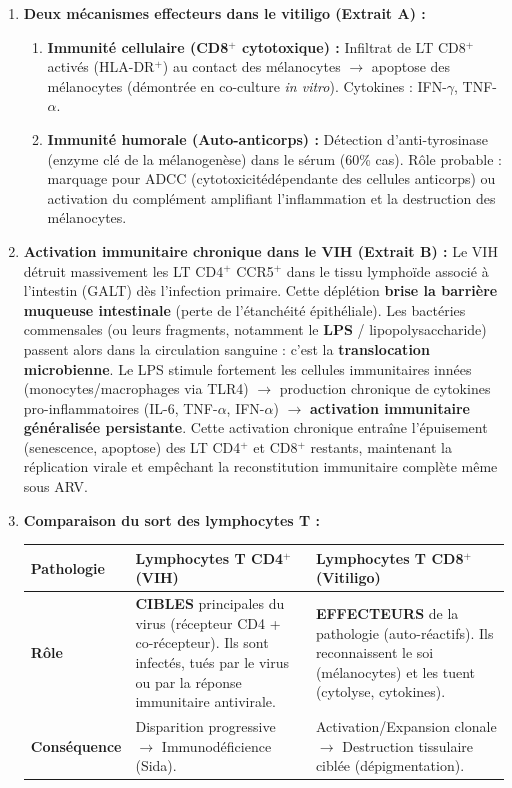 \documentclass[11pt]{article}
\begin{document}
\begin{corrige}
\begin{enumerate}
    \item \textbf{Deux mécanismes effecteurs dans le vitiligo (Extrait A) :}
    \begin{enumerate}
        \item \textbf{Immunité cellulaire (CD8$^+$ cytotoxique) :} Infiltrat de LT CD8$^+$ activés (HLA-DR$^+$) au contact des mélanocytes $\rightarrow$ apoptose des mélanocytes (démontrée en co-culture \emph{in vitro}). Cytokines : IFN-$\gamma$, TNF-$\alpha$.
        \item \textbf{Immunité humorale (Auto-anticorps) :} Détection d'anti-tyrosinase (enzyme clé de la mélanogenèse) dans le sérum (60\% cas). Rôle probable : marquage pour ADCC (cytotoxicitédépendante des cellules anticorps) ou activation du complément amplifiant l'inflammation et la destruction des mélanocytes.
    \end{enumerate}
    \item \textbf{Activation immunitaire chronique dans le VIH (Extrait B) :}
    Le VIH détruit massivement les LT CD4$^+$ CCR5$^+$ dans le tissu lymphoïde associé à l'intestin (GALT) dès l'infection primaire. Cette déplétion \textbf{brise la barrière muqueuse intestinale} (perte de l'étanchéité épithéliale). Les bactéries commensales (ou leurs fragments, notamment le \textbf{LPS} / lipopolysaccharide) passent alors dans la circulation sanguine : c'est la \textbf{translocation microbienne}. Le LPS stimule fortement les cellules immunitaires innées (monocytes/macrophages via TLR4) $\rightarrow$ production chronique de cytokines pro-inflammatoires (IL-6, TNF-$\alpha$, IFN-$\alpha$) $\rightarrow$ \textbf{activation immunitaire généralisée persistante}. Cette activation chronique entraîne l'épuisement (senescence, apoptose) des LT CD4$^+$ et CD8$^+$ restants, maintenant la réplication virale et empêchant la reconstitution immunitaire complète même sous ARV.
    \item \textbf{Comparaison du sort des lymphocytes T :}
    \begin{center}
    \begin{tabularx}{\linewidth}{|l|X|X|}\hline
    \textbf{Pathologie} & \textbf{Lymphocytes T CD4$^+$ (VIH)} & \textbf{Lymphocytes T CD8$^+$ (Vitiligo)} \\ \hline
    \textbf{Rôle} & \textbf{CIBLES} principales du virus (récepteur CD4 + co-récepteur). Ils sont infectés, tués par le virus ou par la réponse immunitaire antivirale. & \textbf{EFFECTEURS} de la pathologie (auto-réactifs). Ils reconnaissent le soi (mélanocytes) et les tuent (cytolyse, cytokines). \\ \hline
    \textbf{Conséquence} & Disparition progressive $\rightarrow$ Immunodéficience (Sida). & Activation/Expansion clonale $\rightarrow$ Destruction tissulaire ciblée (dépigmentation). \\ \hline
    \end{tabularx}
    \end{center}
\end{enumerate}
\end{corrige}
\end{document}
